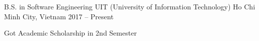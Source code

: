 \begin{cventries}
    \cventry
    {B.S. in Software Engineering}
    {UIT (University of Information Technology)}
    {Ho Chi Minh City, Vietnam}
    {2017 -- Present}
    {
        \begin{cvitems}
            \item {Got Academic Scholarship in 2nd Semester}
        \end{cvitems}
    }
\end{cventries}
